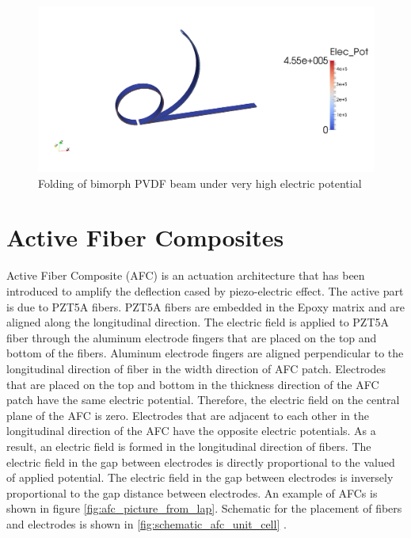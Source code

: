 \begin{figure}
\centering
\includegraphics[trim = 00mm 0mm 00mm 0mm,clip=true,width=7.0in]{./chap_4_structural_analyses/pvdf_folding_beam/folding_pvdf_beam.png}
\caption{Folding of bimorph PVDF beam under very high electric potential}
\label{fig:pvdf_beam_folding} 
\end{figure}


\section{Active Fiber Composites}
Active Fiber Composite (AFC) is an actuation architecture that has been introduced to amplify the deflection cased by piezo-electric effect.
The active part is due to PZT5A fibers. 
PZT5A fibers are embedded in the Epoxy matrix and are aligned along the longitudinal direction.
The electric field is applied to PZT5A fiber through the aluminum electrode fingers that are placed on the top and bottom of the fibers.
Aluminum electrode fingers are aligned perpendicular to the longitudinal direction of fiber in the width direction of AFC patch.
Electrodes that are placed on the top and bottom in the thickness direction of the AFC patch have the same electric potential.
Therefore, the electric field on the central plane of the AFC is zero.
Electrodes that are adjacent to each other in the longitudinal direction of the AFC have the opposite electric potentials.
As a result, an electric field is formed in the longitudinal direction of fibers.
The electric field in the gap between electrodes is directly proportional to the valued of applied potential.
The electric field in the gap between electrodes is inversely proportional to the gap distance between electrodes.
An example of AFCs is shown in figure \ref{fig:afc_picture_from_lap}.
Schematic for the placement of fibers and electrodes is shown in \ref{fig:schematic_afc_unit_cell} \cite{jemai2014mathematical}.

